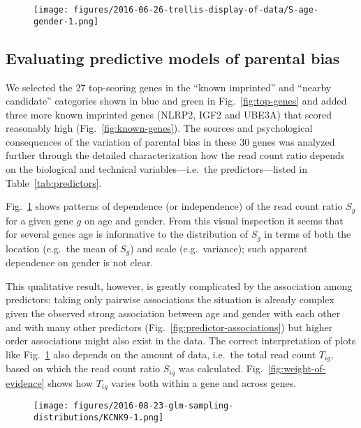 \documentclass[letterpaper]{article}
\begin{document}
\begin{figure}
\begin{center}
\texttt{[image: figures/2016-06-26-trellis-display-of-data/S-age-gender-1.png]}
\caption{}
\label{fig:S-age-gender}
\end{center}
\end{figure}

\subsection{Evaluating predictive models of parental bias}
\label{sec:results-regression}

We selected the 27 top-scoring genes in the ``known imprinted'' and ``nearby
candidate'' categories shown in blue and green in Fig.~\ref{fig:top-genes} and
added three more known imprinted genes (NLRP2, IGF2 and UBE3A) that scored
reasonably high (Fig.~\ref{fig:known-genes}).  The sources and psychological
consequences of the variation of parental bias in these 30 genes was analyzed
further through the detailed characterization how the read count ratio depends
on the biological and technical variables---i.e.~the predictors---listed in Table~\ref{tab:predictors}.

Fig.~\ref{fig:S-age-gender} shows patterns of dependence (or independence) of
the read count ratio \(S_g\) for a given gene \(g\) on age and gender.  From
this visual inspection it seems that for several genes age is informative to
the distribution of \(S_g\) in terms of both the location (e.g.~the mean of
\(S_g\)) and scale (e.g.~variance); such apparent dependence on gender is not
clear.

This qualitative result, however, is greatly complicated by the association
among predictors: taking only pairwise associations the situation is already
complex given the observed strong association between age and gender with each
other and with many other predictors (Fig.~\ref{fig:predictor-associations})
but higher order associations might also exist in the data.
The correct interpretation of plots like Fig.~\ref{fig:S-age-gender} also depends on
the amount of data, i.e.~the total read count \(T_{ig}\), based on which the
read count ratio \(S_{ig}\) was calculated.  Fig.~\ref{fig:weight-of-evidence}
shows how \(T_{ig}\) varies both within a gene and across genes.

\begin{figure}
\begin{center}
\texttt{[image: figures/2016-08-23-glm-sampling-distributions/KCNK9-1.png]}
\end{center}
\caption{}
\label{fig:predicted-curves}
\end{figure}
\end{document}
